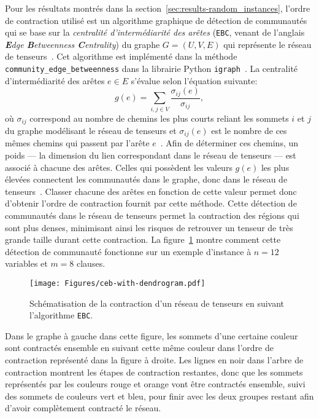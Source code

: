 Pour les résultats montrés dans la section~\ref{sec:results-random_instances}, l'ordre de contraction utilisé est un algorithme graphique de détection de communautés qui se base sur la \emph{centralité d'intermédiarité des arêtes} (\verb|EBC|, venant de l'anglais \textit{\textbf{E}dge \textbf{B}etweenness \textbf{C}entrality}) du graphe $G = (U, V, E)$ qui représente le réseau de tenseurs~\cite{girvan_community_2002}.
Cet algorithme est implémenté dans la méthode \verb|community_edge_betweenness| dans la librairie Python \verb|igraph|~\cite{csardi_igraph_nodate}.
La centralité d'intermédiarité des arêtes $e \in E$ s'évalue selon l'équation suivante:
\begin{equation}\label{eq:edge-betweenness-centrality}
    g(e) = \sum_{i, j \in V} \frac{\sigma_{ij}(e)}{\sigma_{ij}},
\end{equation}
où $\sigma_{ij}$ correspond au nombre de chemins les plus courts reliant les sommets $i$ et $j$ du graphe modélisant le réseau de tenseurs et $\sigma_{ij}(e)$ est le nombre de ces mêmes chemins qui passent par l'arête $e$~\cite{gray_hyper-optimized_2021,girvan_community_2002}.
Afin de déterminer ces chemins, un poids --- la dimension du lien correspondant dans le réseau de tenseurs --- est associé à chacune des arêtes.
Celles qui possèdent les valeurs $g(e)$ les plus élevées connectent les communautés dans le graphe, donc dans le réseau de tenseurs~\cite{girvan_community_2002}.
Classer chacune des arêtes en fonction de cette valeur permet donc d'obtenir l'ordre de contraction fournit par cette méthode.
Cette détection de communautés dans le réseau de tenseurs permet la contraction des régions qui sont plus denses, minimisant ainsi les risques de retrouver un tenseur de très grande taille durant cette contraction.
La figure~\ref{fig:ebc-with-dendrogram} montre  comment cette détection de communauté fonctionne sur un exemple d'instance à $n = 12$ variables et $m = 8$ clauses.
\begin{figure}[h]
    \centering
    \texttt{[image: Figures/ceb-with-dendrogram.pdf]}
    \caption{Schématisation de la contraction d'un réseau de tenseurs en suivant l'algorithme \texttt{EBC}.}
    \label{fig:ebc-with-dendrogram}
\end{figure}
Dans le graphe à gauche dans cette figure, les sommets d'une certaine couleur sont contractés ensemble en suivant cette même couleur dans l'ordre de contraction représenté dans la figure à droite.
Les lignes en noir dans l'arbre de contraction montrent les étapes de contraction restantes, donc que les sommets représentés par les couleurs rouge et orange vont être contractés ensemble, suivi des sommets de couleurs vert et bleu, pour finir avec les deux groupes restant afin d'avoir complètement contracté le réseau.
